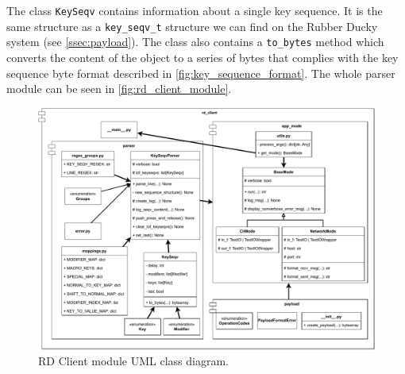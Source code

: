 The class \verb|KeySeqv| contains information about a single key sequence. It is the same structure as a \verb|key_seqv_t| structure we can find on the Rubber Ducky system (see \autoref{ssec:payload}). The class also contains a \verb|to_bytes| method which converts the content of the object to a series of bytes that complies with the key sequence byte format described in \autoref{fig:key_sequence_format}. The whole parser module can be seen in \autoref{fig:rd_client_module}.
\begin{figure}[ht]
    \centering
    \includegraphics[width=\linewidth]{./obrazky-figures/rd_client_module.pdf}
    \caption{RD Client module UML class diagram.}
    \label{fig:rd_client_module}
\end{figure}

